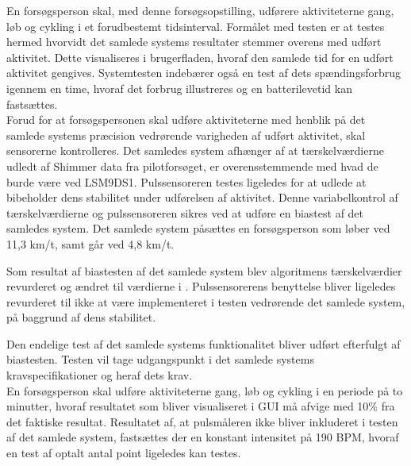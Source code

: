 En forsøgsperson skal, med denne forsøgsopstilling, udførere aktiviteterne gang, løb og cykling i et forudbestemt tidsinterval. Formålet med testen er at testes hermed hvorvidt det samlede systems resultater stemmer overens med udført aktivitet. Dette visualiseres i brugerfladen, hvoraf den samlede tid for en udført aktivitet gengives. Systemtesten indebærer også en test af dets spændingsforbrug igennem en time, hvoraf det forbrug illustreres og en batterilevetid kan fastsættes.\\
Forud for at forsøgspersonen skal udføre aktiviteterne med henblik på det samlede systems præcision vedrørende varigheden af udført aktivitet, skal sensorerne kontrolleres. Det samledes system afhænger af at tærskelværdierne udledt af Shimmer data fra pilotforsøget, er overensstemmende med hvad de burde være ved LSM9DS1. Pulssensoreren testes ligeledes for at udlede at bibeholder dens stabilitet under udførelsen af aktivitet. Denne variabelkontrol af tærskelværdierne og pulssensoreren sikres ved at udføre en biastest af det samledes system. Det samlede system påsættes en forsøgsperson som løber ved 11,3 km/t, samt går ved 4,8 km/t. 
\begin{table}[H]
	\centering
	\caption{I tabellen ses testresultaterne omhandlede revurdering af algoritmens tærskelværdier, samt vurdering af pulssensor.}
	\label{tab:Test_revurdering}
\end{table}\vspace{-.5cm}
Som resultat af biastesten af det samlede system blev algoritmens tærskelværdier revurderet og ændret til værdierne i . Pulssensorerens benyttelse bliver ligeledes revurderet til ikke at være implementeret i testen vedrørende det samlede system, på baggrund af dens stabilitet.

Den endelige test af det samlede systems funktionalitet bliver udført efterfulgt af biastesten. Testen vil tage udgangspunkt i det samlede systems kravspecifikationer og heraf dets krav. \\
En forsøgsperson skal udføre aktiviteterne gang, løb og cykling i en periode på to minutter, hvoraf resultatet som bliver visualiseret i GUI må afvige med 10\% fra det faktiske resultat. Resultatet af, at pulsmåleren ikke bliver inkluderet i testen af det samlede system, fastsættes der en konstant intensitet på 190 BPM, hvoraf en test af optalt antal point ligeledes kan testes. 

